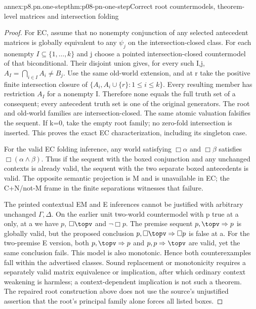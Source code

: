 \begin{annexitem}{annex:p8.pn.one-step}{thm:p08-pn-one-step}{Correct root countermodels, theorem-level matrices and intersection folding}
\begin{proof}
For EC, assume that no nonempty conjunction of any selected
antecedent matrices is globally equivalent to any \(\psi_j\)
on the intersection-closed class. For each nonempty
\(I\subseteq\{1,\ldots,k\}\) and j choose a pointed
intersection-closed countermodel of that biconditional. Their
disjoint union gives, for every such I,j,
\(A_I=\bigcap_{i\in I}A_i\ne B_j\). Use the same old-world
extension, and at r take the positive finite intersection closure
of \(\{A_i,A_i\cup\{r\}:1\leq i\leq k\}\).
Every resulting member has restriction \(A_I\) for a nonempty
I. Therefore none equals the full truth set of a consequent;
every antecedent truth set is one of the original generators.
The root and old-world families are intersection-closed. The same
atomic valuation falsifies the sequent. If k=0, take the empty
root family; no zero-fold intersection is inserted. This proves
the exact EC characterization, including its singleton case.

For the valid EC folding inference, any world satisfying
\(\Box\alpha\) and \(\Box\beta\) satisfies
\(\Box(\alpha\land\beta)\). Thus if the sequent with the
boxed conjunction and any unchanged contexts is already valid,
the sequent with the two separate boxed antecedents is valid.
The opposite semantic projection is M and is unavailable in EC;
the C+N/not-M frame in the finite separations witnesses that failure.

The printed contextual EM and E inferences cannot be justified
with arbitrary unchanged \(\Gamma,\Delta\). On the earlier
unit two-world countermodel with p true at a only, at a we have
\(p\), \(\Box\topv\) and \(\neg\Box p\).
The premise sequent \(p,\topv\Rightarrow p\) is globally
valid, but the proposed conclusion
\(p,\Box\topv\Rightarrow\Box p\) is false at a.
For the two-premise E version, both
\(p,\topv\Rightarrow p\) and \(p,p\Rightarrow\topv\)
are valid, yet the same conclusion fails. This model is also
monotonic. Hence both counterexamples fall within the advertised
classes. Sound replacement or monotonicity requires a separately
valid matrix equivalence or implication, after which ordinary
context weakening is harmless; a context-dependent implication
is not such a theorem. The repaired root construction above
does not use the source's unjustified assertion that the root's
principal family alone forces all listed boxes.
\end{proof}
\end{annexitem}

